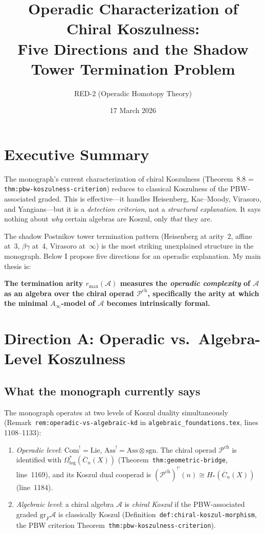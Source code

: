 \documentclass[11pt]{article}
\title{%
  Operadic Characterization of Chiral Koszulness:\\
  Five Directions and the Shadow Tower Termination Problem}
\author{RED-2 (Operadic Homotopy Theory)}
\date{17 March 2026}
\theoremstyle{definition}
\theoremstyle{remark}
\newcommand{\Pch}{\mathcal{P}^{\mathrm{ch}}}
\newcommand{\FM}{\overline{C}}
\newcommand{\cA}{\mathcal{A}}
\begin{document}
\maketitle

\section*{Executive Summary}

The monograph's current characterization of chiral Koszulness
(Theorem~8.8 = \texttt{thm:pbw-koszulness-criterion}) reduces to
classical Koszulness of the PBW-associated graded.  This is
effective---it handles Heisenberg, Kac--Moody, Virasoro, and
Yangians---but it is a \emph{detection criterion}, not a
\emph{structural explanation}.  It says nothing about \emph{why}
certain algebras are Koszul, only \emph{that} they are.

The shadow Postnikov tower termination pattern
(Heisenberg at arity~2, affine at~3, $\beta\gamma$ at~4,
Virasoro at~$\infty$) is the most striking unexplained structure in
the monograph.  Below I propose five directions for an operadic
explanation.  My main thesis is:

\medskip
\noindent\textbf{The termination arity $r_{\max}(\cA)$ measures the
\emph{operadic complexity} of $\cA$ as an algebra over the chiral
operad $\Pch$, specifically the arity at which the minimal
$A_\infty$-model of $\cA$ becomes intrinsically formal.}

\section{Direction A: Operadic vs.\ Algebra-Level Koszulness}

\subsection{What the monograph currently says}

The monograph operates at two levels of Koszul duality
simultaneously (Remark~\texttt{rem:operadic-vs-algebraic-kd} in
\texttt{algebraic\_foundations.tex}, lines 1108--1133):

\begin{enumerate}[label=(\alph*)]
\item \emph{Operadic level}: $\mathrm{Com}^! = \mathrm{Lie}$,
  $\mathrm{Ass}^! = \mathrm{Ass} \otimes \mathrm{sgn}$.
  The chiral operad $\Pch$ is identified with
  $\Omega^*_{\log}(\FM_n(X))$ (Theorem~\texttt{thm:geometric-bridge},
  line~1169), and its Koszul dual cooperad is
  $(\Pch)^{!\prime}(n) \cong H_*(\FM_n(X))$
  (line~1184).
\item \emph{Algebraic level}: a chiral algebra $\cA$ is
  \emph{chiral Koszul} if the PBW-associated graded
  $\mathrm{gr}_F \cA$ is classically Koszul
  (Definition~\texttt{def:chiral-koszul-morphism}, the PBW criterion
  Theorem~\texttt{thm:pbw-koszulness-criterion}).
\end{enumerate}
\end{document}
